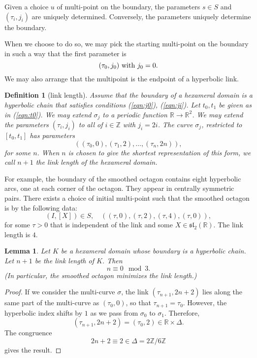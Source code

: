 \documentclass[11pt]{amsart}
\newtheorem{definition}{Definition}
\newtheorem{lemma}{Lemma}
\newcommand{\ring}[1]{\mathbb{#1}}
\def\rZ{{\ring{Z}}}
\def\rR{{\ring{R}}}
\def\ta{{\tau}}
\begin{document}
Given a choice $u$ of multi-point on the boundary, the parameters $s\in S$ and $(\ta_i,j_i)$
are uniquely determined.  Conversely, the parameters uniquely determine the boundary.

When we choose to do so, we may pick the starting multi-point on
the boundary in such a way
that the first parameter is
\begin{equation}\label{eqn:j0}
(\ta_0,j_0) \hbox{ with } j_0=0.
\end{equation}  
We may also arrange
that the multipoint is the endpoint of a hyperbolic link.

\begin{definition}[link length]
Assume that the boundary of a hexameral domain is a hyperbolic
chain that satisfies conditions (\ref{eqn:j0}), (\ref{eqn:ji}).
Let $t_0,t_1$ be given as in (\ref{eqn:t0}).  We may extend
$\sigma_j$ to a periodic function $\rR\to\rR^2$.  We may extend
the parameters $(\ta_i,j_i)$ to all of $i\in\rZ$ with $j_i = 2i$.
The curve $\sigma_j$, restricted to $[t_0,t_1]$ has parameters
$$
((\ta_0,0),(\ta_1,2),\ldots,(\ta_n,2n)),
$$
for some $n$.  When $n$ is chosen to give the shortest representation of this form, we call $n+1$ the {\it link length} of the hexameral domain.
\end{definition}

For example,
the boundary of the smoothed octagon contains
eight hyperbolic arcs, one at each corner of the octagon. They appear
in centrally symmetric pairs.
There exists a choice of initial multi-point such that the smoothed octagon is by the following data:
$$
(I,[X])\in S,\quad ((\ta,0),(\ta,2),(\ta,4),(\ta,0)),
$$
for some $\ta>0$ that is independent of the link and some
$X\in\mathfrak{sl}_2(\rR)$.
The link length is $4$.

\begin{lemma}\label{lemma:link}  Let $K$ be a hexameral domain whose boundary is
a hyperbolic chain.  Let $n+1$ be the link length of $K$.  Then
$$n\equiv 0 \mod 3.$$
(In particular, the smoothed octagon minimizes the link length.)
\end{lemma}

\begin{proof} If we consider the multi-curve $\sigma$, the link
$(\ta_{n+1},2n+2)$ lies along the same part of the multi-curve as $(\ta_0,0)$,
so that $\ta_{n+1}=\ta_0$.  However, the hyperbolic index shifts by
$1$ as we pass from $\sigma_0$ to $\sigma_1$.  Therefore,
$$(\ta_{n+1},2n+2) = (\ta_0,2)\in \rR\times \Delta.$$
The congruence $$2n+2 \equiv 2\in \Delta = 2\rZ/6\rZ$$
gives the result.
\end{proof}
\end{document}
